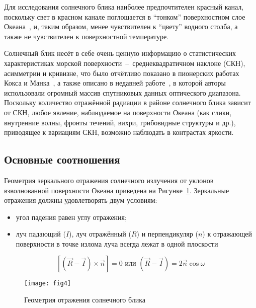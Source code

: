 Для исследования солнечного блика наиболее предпочтителен красный канал, поскольку свет в красном канале поглощается в ``тонком'' поверхностном слое Океана~\citep{Jerlov1976}, и, таким образом, менее чувствителен к ``цвету'' водного столба, а также не чувствителен к поверхностной температуре.

Солнечный блик несёт в себе очень ценную информацию о статистических характеристиках морской поверхности~--~среднеквадратичном наклоне (СКН), асимметрии и кривизне, что было отчётливо показано в пионерских работах Кокса и Манка~\citep{Cox1954, Cox1954a, Cox1956}, а также описано в недавней работе~\citep{Breon2006}, в которой авторы использовали огромный массив спутниковых данных оптического диапазона. Поскольку количество отражённой радиации в районе солнечного блика зависит от СКН, любое явление, наблюдаемое на поверхности Океана (как слики, внутренние волны, фронты течений, вихри, грибовидные структуры и др.), приводящее к вариациям СКН, возможно наблюдать в контрастах яркости.



\subsection{Основные соотношения}


Геометрия зеркального отражения солнечного излучения от уклонов взволнованной поверхности Океана приведена на Рисунке~\ref{fig:4}. Зеркальные отражения должны удовлетворять двум условиям:
\begin{itemize}
	\item угол падения равен углу отражения;
	\item луч падающий ($I$), луч отражённый ($R$) и перпендикуляр ($n$) к отражающей поверхности в точке излома луча всегда лежат в одной плоскости
\end{itemize}



\begin{equation} \label{eq:1.1} 
    \left[\left(\vec{R}-\vec{I}\right)\times \vec{n}\right]=0 \mbox{ или } \left(\vec{R}-\vec{I}\right)=2\vec{n}\cos \omega
\end{equation}


\begin{figure}[!thb]
    \texttt{[image: fig4]}
    \caption{Геометрия отражения солнечного блика}
    \label{fig:4}
\end{figure}

